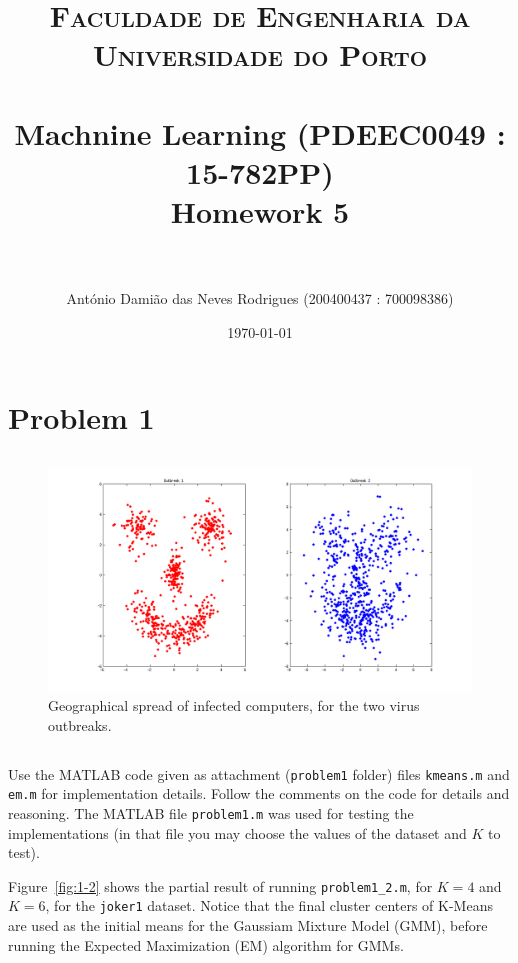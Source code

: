 \documentclass[paper=a4, fontsize=11pt]{scrartcl} %
\title{	
\normalfont \normalsize 
\textsc{Faculdade de Engenharia da Universidade do Porto} \\ [25pt] %
\horrule{0.5pt} \\[0.4cm] %
\LARGE Machnine Learning (PDEEC0049 : 15-782PP)\\ \Large Homework 5 \\ %
\horrule{2pt} \\[0.5cm] %
}
\author{António Damião das Neves Rodrigues (200400437 : 700098386)} %
\date{\normalsize\today} %
\numberwithin{equation}{section} %
\numberwithin{figure}{section} %
\numberwithin{table}{section} %
\newcommand{\vertbreak}{\vspace{1.75 mm}}
\begin{document}
\maketitle %

\section{Problem 1}

\subsection{}
\label{subsec:1-1}

\begin{figure}[h!]

    \centering
    \includegraphics[width=1.00\textwidth]{figures/outbreak.png}
    \caption{Geographical spread of infected computers, for the two virus 
            outbreaks.}
    \label{fig:1-1}

\end{figure}

\subsection{}
\label{subsec:1-2}

Use the MATLAB code given as attachment (\verb+problem1+ folder) files 
\verb+kmeans.m+ and \verb+em.m+ for implementation details. Follow the comments 
on the code for details and reasoning. The MATLAB file \verb+problem1.m+ was 
used for testing the implementations (in that file you may choose the 
values of the dataset and $K$ to test).\vertbreak

Figure~\ref{fig:1-2} shows the partial result of running \verb+problem1_2.m+, for 
$K = 4$ and $K = 6$, for the \verb+joker1+ dataset. Notice that the final cluster 
centers of K-Means are used as the initial means for the Gaussiam Mixture Model 
(GMM), before running the Expected Maximization (EM) algorithm for GMMs.
\end{document}
